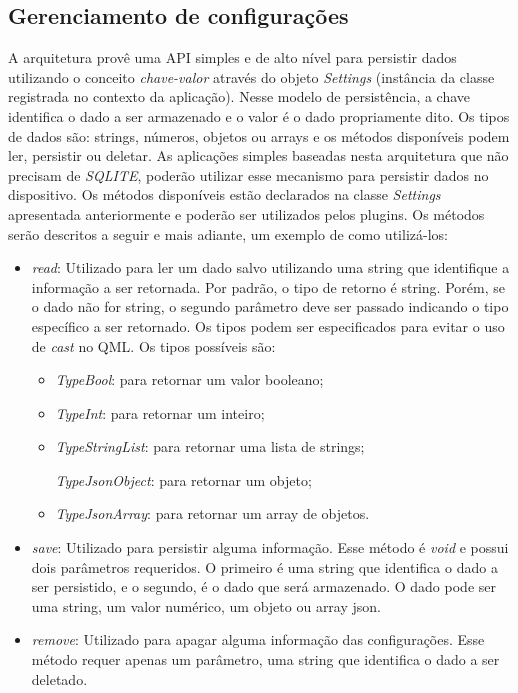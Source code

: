 \subsection{Gerenciamento de configurações}
A arquitetura provê uma API simples e de alto nível para persistir dados utilizando o conceito \textit{chave-valor} através do objeto \textit{Settings} (instância da classe registrada no contexto da aplicação). Nesse modelo de persistência, a chave identifica o dado a ser armazenado e o valor é o dado propriamente dito. Os tipos de dados são: strings, números, objetos ou arrays e os métodos disponíveis podem ler, persistir ou deletar. As aplicações simples baseadas nesta arquitetura que não precisam de \textit{SQLITE}, poderão utilizar esse mecanismo para persistir dados no dispositivo. Os métodos disponíveis estão declarados na classe \textit{Settings} apresentada anteriormente e poderão ser utilizados pelos plugins. Os métodos serão descritos a seguir e mais adiante, um exemplo de como utilizá-los:
	\begin{itemize}
		\item \textit{read}: Utilizado para ler um dado salvo utilizando uma string que identifique a informação a ser retornada. Por padrão, o tipo de retorno é string. Porém, se o dado não for string, o segundo parâmetro deve ser passado indicando o tipo específico a ser retornado. Os tipos podem ser especificados para evitar o uso de \textit{cast} no QML. Os tipos possíveis são:
		\begin{itemize}
			\item \textit{TypeBool}: para retornar um valor booleano;

			\item \textit{TypeInt}: para retornar um inteiro;

			\item \textit{TypeStringList}: para retornar uma lista de strings;

			\textit{TypeJsonObject}: para retornar um objeto;

			\item \textit{TypeJsonArray}: para retornar um array de objetos.
		\end{itemize}

		\item \textit{save}: Utilizado para persistir alguma informação. Esse método é \textit{void} e possui dois parâmetros requeridos. O primeiro é uma string que identifica o dado a ser persistido, e o segundo, é o dado que será armazenado. O dado pode ser uma string, um valor numérico, um objeto ou array json.

		\item \textit{remove}: Utilizado para apagar alguma informação das configurações. Esse método requer apenas um parâmetro, uma string que identifica o dado a ser deletado.
	\end{itemize}

